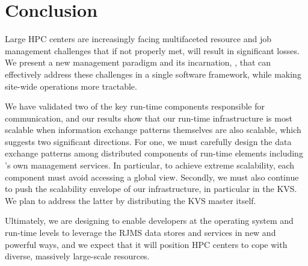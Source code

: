 \section{Conclusion}
Large HPC centers are increasingly facing 
multifaceted resource and job management challenges
that if not properly met, will result 
in significant losses.  
We present a new management paradigm and its incarnation, \flux, that can effectively
address these challenges in a single software framework,
while making site-wide operations more tractable.

We have validated two of the key run-time components responsible for communication,
and our results show that our run-time 
infrastructure is most scalable when information 
exchange patterns themselves are also scalable, which suggests two significant directions. 
For one, we must carefully design the data exchange patterns
among distributed components of run-time elements including \flux's own management services. 
In particular, to achieve extreme scalability, each component 
must avoid accessing a global view.
Secondly, we must also continue to push the 
scalability envelope of our infrastructure, in particular in the
KVS. We plan to address the latter by 
distributing the KVS master itself.
%

Ultimately, we are designing \flux to  
enable developers at the operating system and
run-time levels to leverage the RJMS data stores and services in
new and powerful ways, and we expect that it will position HPC centers to cope
with diverse, massively large-scale resources.

